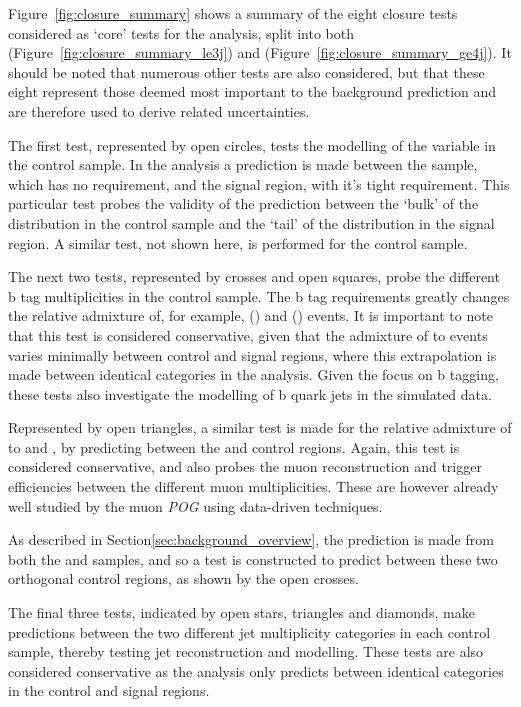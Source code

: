 Figure~\ref{fig:closure_summary} shows a summary of the eight closure tests 
considered as `core' tests for the analysis, split into both
\njlow (Figure~\ref{fig:closure_summary_le3j}) 
and \njhigh (Figure~\ref{fig:closure_summary_ge4j}). It should be noted that 
numerous other tests are also considered, but that these eight represent those 
deemed most important to the background prediction and are therefore used to
derive related uncertainties.

The first test, represented by open circles, tests the modelling of the \alphat 
variable in the \mj control sample. In the analysis a prediction is made 
between the \mj sample, which has no \alphat requirement, and the 
signal region, with it's tight \alphat requirement. This particular test probes
the validity of the prediction between the `bulk' of the \alphat distribution in
the control sample
and the `tail' of the distribution in the signal region. A similar test, not
shown here, is performed for the \mmj control sample.

The next two tests, represented by crosses and open squares, probe the
different b tag multiplicities in the \mj control sample. The b tag 
requirements greatly changes the relative admixture of, for example, \wj ()
and \ttj () events.
It is important to note that this test is 
considered conservative, given that the admixture of \wj to \ttj events 
varies minimally between control and signal regions, where this extrapolation is 
made between identical \nb categories in the analysis. Given the focus on b
tagging, these tests also investigate the modelling of b quark jets in the
simulated data.

Represented by open triangles, a similar test is made for the relative
admixture of \zj to \wj and \ttj, by  predicting between the \mj and \mmj
control regions. Again, this test is considered conservative, and also probes
the muon reconstruction and trigger efficiencies between the different muon
multiplicities. These are however already well studied by the muon \emph{POG}
using data-driven techniques.

As described in Section\ref{sec:background_overview}, the \zinv prediction 
is made from both the \gj and \mmj samples, and so a test is constructed to 
predict between these two orthogonal control regions, as shown by the open 
crosses.

The final three tests, indicated by open stars, triangles and diamonds, make 
predictions between the two different jet multiplicity categories in each 
control sample, thereby 
testing jet reconstruction and modelling. These tests are also considered 
conservative as the analysis only predicts between identical \nj categories in 
the control and signal regions.


